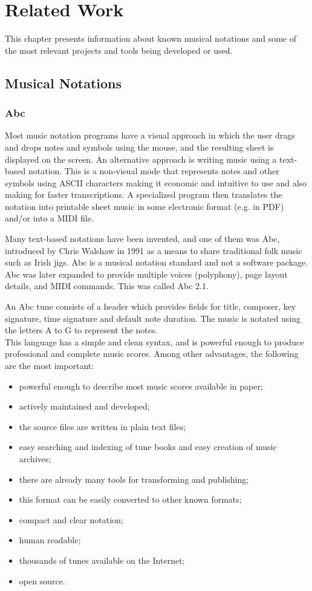 \documentclass[main.tex]{files}
\begin{document}
\chapter{Related Work}
This chapter presents information about known musical notations and some of the most relevant
projects and tools being developed or used.

\section{Musical Notations} 

\subsection{Abc}

Most music notation programs have a visual approach in which the user drags and drops notes
and symbols using the mouse, and the resulting sheet is displayed on the screen. An alternative
approach is writing music using a text-based notation. This is a non-visual mode that represents
notes and other symbols using \ac{ASCII} characters making it economic and intuitive to use and
also making for faster transcriptions. A specialized program then translates the notation into
printable sheet music in some electronic format (e.g. in PDF) and/or into a MIDI file.

Many text-based notations have been invented, and one of them was Abc\cite{abcnotation:Online},
introduced by Chris Walshaw in 1991 as a means to share traditional folk music such as Irish jigs.
Abc is a musical notation standard and not a software package. Abc was later expanded to provide
multiple voices (polyphony), page layout details, and MIDI commands. This was called Abc 2.1.

An Abc tune consists of a header which provides fields for title, composer, key signature,
time signature and default note duration. The music is notated using the letters A to G to
represent the notes.\\
This language has a simple and clean syntax, and is powerful enough to
produce professional and complete music scores. Among other advantages, the following are the
most important: 
\begin{itemize}
  \item powerful enough to describe most music scores available in paper; 
  \item actively maintained and developed; 
  \item the source files are written in plain text files; 
  \item easy searching and indexing of tune books and easy creation of music archives; 
  \item there are already many tools for transforming and publishing; 
  \item this format can be easily converted to other known formats; 
  \item compact and clear notation; 
  \item human readable;
  \item thousands of tunes available on the Internet; 
  \item open source.
\end{itemize}
\end{document}
